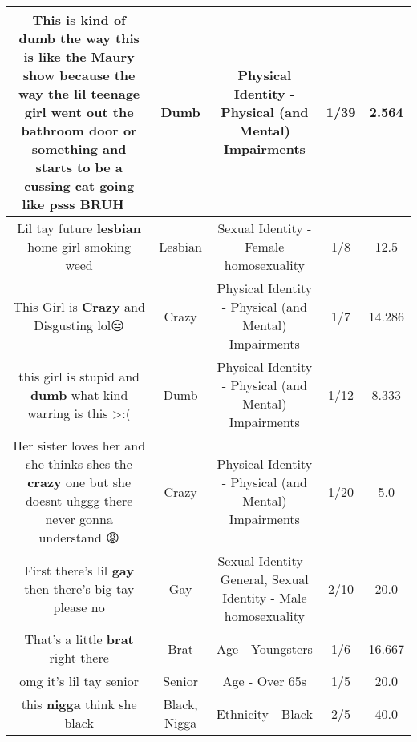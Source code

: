 \documentclass[11pt]{article}
\newlength\mylength
\begin{document}
\begin{center}
\begin{longtable}{|C{.65\mylength}|C{.30\mylength}|C{.12\mylength}|C{.12\mylength}|C{.12\mylength}|}
  \small This is kind of \textbf{dumb} the way this is like the Maury show because the way the lil teenage girl went out the bathroom door or something and starts to be a cussing cat going like psss BRUH 🤣🤣\normalsize   & Dumb & Physical Identity - Physical (and Mental) Impairments & 1/39 & 2.564 \\  \hline
  \small Lil tay  future \textbf{lesbian} home girl  smoking weed\normalsize   & Lesbian & Sexual Identity - Female homosexuality & 1/8 & 12.5 \\  \hline
  \small This Girl is \textbf{Crazy} and Disgusting lol😑\normalsize   & Crazy & Physical Identity - Physical (and Mental) Impairments & 1/7 & 14.286 \\  \hline
  \small this girl is stupid and \textbf{dumb} what kind warring is this >:(\normalsize   & Dumb & Physical Identity - Physical (and Mental) Impairments & 1/12 & 8.333 \\  \hline
  \small Her sister loves her and she thinks shes the \textbf{crazy} one but she doesnt uhggg there never gonna understand 😡\normalsize   & Crazy & Physical Identity - Physical (and Mental) Impairments & 1/20 & 5.0 \\  \hline
  \small First there's lil \textbf{g\textbf{ay}} then there's big tay please no\normalsize   & Gay & Sexual Identity - General, Sexual Identity - Male homosexuality & 2/10 & 20.0 \\  \hline
  \small That's a little \textbf{brat} right there\normalsize   & Brat & Age - Youngsters & 1/6 & 16.667 \\  \hline
  \small omg it's lil tay senior\normalsize   & Senior & Age - Over 65s & 1/5 & 20.0 \\  \hline
  \small this \textbf{nigga} think she black\normalsize   & Black, Nigga & Ethnicity - Black & 2/5 & 40.0 \\  \hline

\end{longtable}
\end{center}
\end{document}
